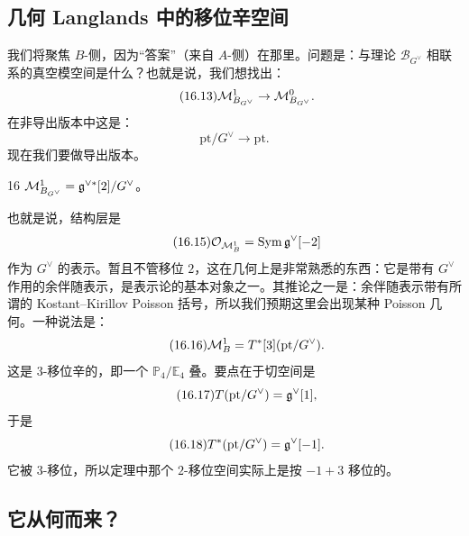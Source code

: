 \subsection{几何 Langlands 中的移位辛空间}

我们将聚焦 $B$-侧，因为“答案”（来自 $A$-侧）在那里。问题是：与理论 $\mathcal{B}_{G^\vee}$ 相联系的真空模空间是什么？也就是说，我们想找出：
\begin{equation}\tag{16.13}
\mathcal{M}^1_{B_{G^\vee}}\to\mathcal{M}^0_{B_{G^\vee}}.
\end{equation}
在非导出版本中这是：
\begin{equation}\tag{16.14}
\mathrm{pt}/G^\vee\to\mathrm{pt}.
\end{equation}
现在我们要做导出版本。

\begin{srcthm}{16}
$\mathcal{M}^1_{B_{G^\vee}}=\mathfrak{g}^{\vee*}[2]/G^\vee$。
\end{srcthm}

也就是说，结构层是
\begin{equation}\tag{16.15}
\mathcal{O}_{\mathcal{M}^1_B}=\mathrm{Sym}\,\mathfrak{g}^\vee[-2]
\end{equation}
作为 $G^\vee$ 的表示。暂且不管移位 $2$，这在几何上是非常熟悉的东西：它是带有 $G^\vee$ 作用的余伴随表示，是表示论的基本对象之一。其推论之一是：余伴随表示带有所谓的 Kostant--Kirillov Poisson 括号，所以我们预期这里会出现某种 Poisson 几何。一种说法是：
\begin{equation}\tag{16.16}
\mathcal{M}^1_B=T^*[3](\mathrm{pt}/G^\vee).
\end{equation}
这是 $3$-移位辛的，即一个 $\mathbb{P}_4/\mathbb{E}_4$ 叠。要点在于切空间是
\begin{equation}\tag{16.17}
T(\mathrm{pt}/G^\vee)=\mathfrak{g}^\vee[1],
\end{equation}
于是
\begin{equation}\tag{16.18}
T^*(\mathrm{pt}/G^\vee)=\mathfrak{g}^\vee[-1].
\end{equation}
它被 $3$-移位，所以定理中那个 $2$-移位空间实际上是按 $-1+3$ 移位的。%

\subsection{它从何而来？}

